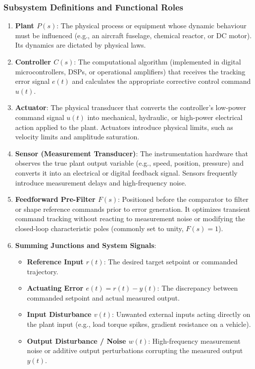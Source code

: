 \documentclass[12pt,onecolumn,twoside ]{article}
\begin{document}
	\subsubsection{Subsystem Definitions and Functional Roles}
	\begin{enumerate}
		\item
		\textbf{Plant $P(s)$}: The physical process or equipment whose dynamic behaviour must be influenced (e.g., an aircraft fuselage, chemical reactor, or DC motor). Its dynamics are dictated by physical laws.
		\item
		\textbf{Controller $C(s)$}: The computational algorithm (implemented in digital microcontrollers, DSPs, or operational amplifiers) that receives the tracking error signal $e(t)$ and calculates the appropriate corrective control command $u(t)$.
		\item
		\textbf{Actuator}: The physical transducer that converts the controller's low-power command signal $u(t)$ into mechanical, hydraulic, or high-power electrical action applied to the plant. Actuators introduce physical limits, such as velocity limits and amplitude saturation.
		\item
		\textbf{Sensor (Measurement Transducer)}: The instrumentation hardware that observes the true plant output variable (e.g., speed, position, pressure) and converts it into an electrical or digital feedback signal. Sensors frequently introduce measurement delays and high-frequency noise.
		\item
		\textbf{Feedforward Pre-Filter $F(s)$}: Positioned before the comparator to filter or shape reference commands prior to error generation. It optimizes transient command tracking without reacting to measurement noise or modifying the closed-loop characteristic poles (commonly set to unity, $F(s) = 1$).
		\item
		\textbf{Summing Junctions and System Signals}:
		\begin{itemize}
			\item
			\textbf{Reference Input $r(t)$}: The desired target setpoint or commanded trajectory.
			\item
			\textbf{Actuating Error $e(t) = r(t) - y(t)$}: The discrepancy between commanded setpoint and actual measured output.
			\item
			\textbf{Input Disturbance $v(t)$}: Unwanted external inputs acting directly on the plant input (e.g., load torque spikes, gradient resistance on a vehicle).
			\item
			\textbf{Output Disturbance / Noise $w(t)$}: High-frequency measurement noise or additive output perturbations corrupting the measured output $y(t)$.
		\end{itemize}
	\end{enumerate}
\end{document}

